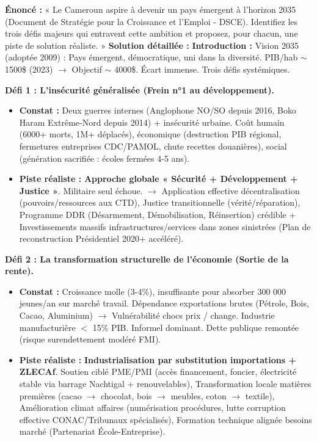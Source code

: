 \documentclass[11pt]{article}
\begin{document}
\begin{exoresolu}
\textbf{Énoncé :} « Le Cameroun aspire à devenir un pays émergent à l'horizon 2035 (Document de Stratégie pour la Croissance et l'Emploi - DSCE). Identifiez les trois défis majeurs qui entravent cette ambition et proposez, pour chacun, une piste de solution réaliste. »
\tcblower
\textbf{Solution détaillée :}
\textbf{Introduction :} Vision 2035 (adoptée 2009) : Pays émergent, démocratique, uni dans la diversité. PIB/hab $\sim$ 1500\$ (2023) $\rightarrow$ Objectif $\sim$ 4000\$. Écart immense. Trois défis systémiques.
\par
\textbf{Défi 1 : L'insécurité généralisée (Frein n°1 au développement).}
\begin{itemize}
    \item \textbf{Constat :} Deux guerres internes (Anglophone NO/SO depuis 2016, Boko Haram Extrême-Nord depuis 2014) + insécurité urbaine. Coût humain (6000+ morts, 1M+ déplacés), économique (destruction PIB régional, fermetures entreprises CDC/PAMOL, chute recettes douanières), social (génération sacrifiée : écoles fermées 4-5 ans).
    \item \textbf{Piste réaliste :} \textbf{Approche globale « Sécurité + Développement + Justice »}. Militaire seul échoue. $\rightarrow$ Application effective décentralisation (pouvoirs/ressources aux CTD), Justice transitionnelle (vérité/réparation), Programme DDR (Désarmement, Démobilisation, Réinsertion) crédible + Investissements massifs infrastructures/services dans zones sinistrées (Plan de reconstruction Présidentiel 2020+ accéléré).
\end{itemize}
\textbf{Défi 2 : La transformation structurelle de l'économie (Sortie de la rente).}
\begin{itemize}
    \item \textbf{Constat :} Croissance molle (3-4\%), insuffisante pour absorber 300 000 jeunes/an sur marché travail. Dépendance exportations brutes (Pétrole, Bois, Cacao, Aluminium) $\rightarrow$ Vulnérabilité chocs prix / change. Industrie manufacturière $<$ 15\% PIB. Informel dominant. Dette publique remontée (risque surendettement modéré FMI).
    \item \textbf{Piste réaliste :} \textbf{Industrialisation par substitution importations + ZLECAf}. Soutien ciblé PME/PMI (accès financement, foncier, électricité stable via barrage Nachtigal + renouvelables), Transformation locale matières premières (cacao $\rightarrow$ chocolat, bois $\rightarrow$ meubles, coton $\rightarrow$ textile), Amélioration climat affaires (numérisation procédures, lutte corruption effective CONAC/Tribunaux spécialisés), Formation technique alignée besoins marché (Partenariat École-Entreprise).

\end{itemize}
\end{exoresolu}
\end{document}
